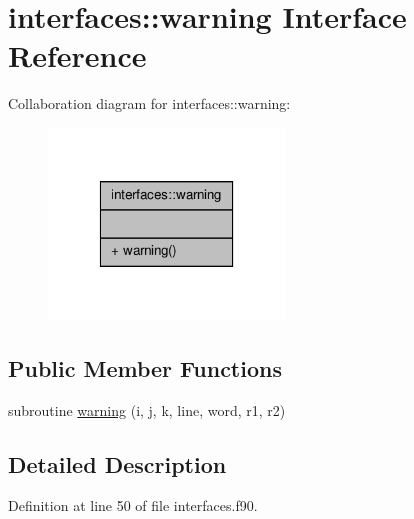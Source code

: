 \hypertarget{interfaceinterfaces_1_1warning}{\section{interfaces\-:\-:warning Interface Reference}
\label{interfaceinterfaces_1_1warning}
}


Collaboration diagram for interfaces\-:\-:warning\-:\nopagebreak
\begin{figure}[H]
\begin{center}
\leavevmode
\includegraphics[width=178pt]{interfaceinterfaces_1_1warning__coll__graph}
\end{center}
\end{figure}
\subsection*{Public Member Functions}
\begin{DoxyCompactItemize}
\item 
subroutine \hyperlink{interfaceinterfaces_1_1warning_a167b4a1eeeff911a881c3159e243147d}{warning} (i, j, k, line, word, r1, r2)
\end{DoxyCompactItemize}


\subsection{Detailed Description}


Definition at line 50 of file interfaces.\-f90.



